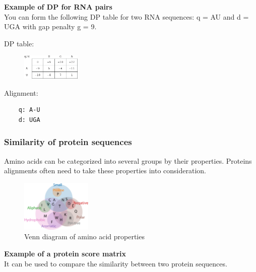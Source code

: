 \noindent \textbf{Example of DP for RNA pairs} \\
\noindent You can form the following DP table for two RNA sequences: q = AU and d = UGA with gap penalty g = 9.
\begin{multicols}{2}
DP table:
\begin{figure}[H]
  \centering
      \includegraphics[width=0.25\textwidth]{fig03/example_rna_alignment.png}
\end{figure}

Alignment:
\begin{verbatim}
    q: A-U
    d: UGA
\end{verbatim}

\end{multicols} 

%
%
\subsubsection*{Similarity of protein sequences}
Amino acids can be categorized into several groups by their properties. Proteins alignments often need to take these properties into consideration.

\begin{figure}[H]
  \centering
      \includegraphics[width=0.3\textwidth]{fig03/amino_acid_properties.png}
  \caption{Venn diagram of amino acid properties }
\end{figure}

\noindent
\textbf{Example of a protein score matrix}\\
It can be used to compare the similarity between two protein sequences.

